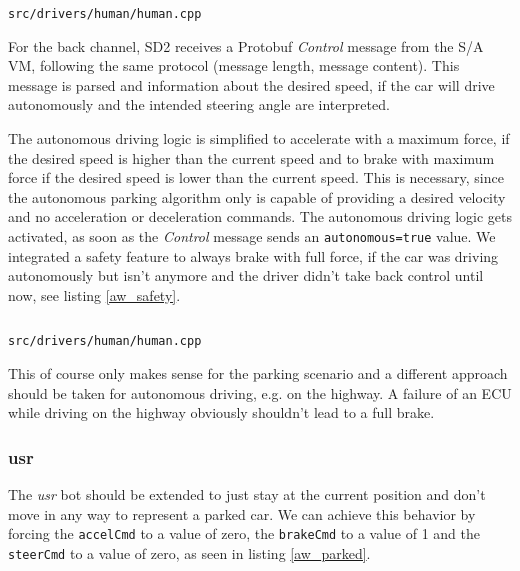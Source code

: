 \documentclass[paper=a4, fontsize=11pt]{scrreprt}
\begin{document}
\begin{listing}[ht]
  \inputminted[firstline=352,linenos=true,lastline=363,gobble=4]{c++}{../../../simulators/speed-dreams/src/drivers/human/human.cpp}
  \caption{\texttt{src/drivers/human/human.cpp}}\label{aw_send}
\end{listing}

For the back channel, SD2 receives a Protobuf \textit{Control} message from the S/A VM,
following the same protocol (message length, message content).
This message is parsed and information about the desired speed,
if the car will drive autonomously and the intended steering angle are interpreted.

The autonomous driving logic is simplified to accelerate with a maximum force,
if the desired speed is higher than the current speed
and to brake with maximum force if the desired speed is lower than the current speed.
This is necessary,
since the autonomous parking algorithm only is capable of providing a desired velocity
and no acceleration or deceleration commands.
The autonomous driving logic gets activated,
as soon as the \textit{Control} message sends an \texttt{autonomous=true} value.
We integrated a safety feature to always brake with full force,
if the car was driving autonomously but isn't anymore
and the driver didn't take back control until now, see listing \ref{aw_safety}.

\begin{listing}[ht]
  \inputminted[firstline=422,linenos=true,lastline=426,gobble=6]{c++}{../../../simulators/speed-dreams/src/drivers/human/human.cpp}
  \caption{\texttt{src/drivers/human/human.cpp}}\label{aw_safety}
\end{listing}

This of course only makes sense for the parking scenario
and a different approach should be taken for autonomous driving, e.g. on the highway.
A failure of an ECU while driving on the highway obviously shouldn't lead to a full brake.

\subsubsection{usr}
The \textit{usr} bot should be extended to just stay at the current position
and don't move in any way to represent a parked car.
We can achieve this behavior by forcing the \texttt{accelCmd} to a value of zero,
the \texttt{brakeCmd} to a value of 1 and the \texttt{steerCmd} to a value of zero,
as seen in listing \ref{aw_parked}.
\end{document}
